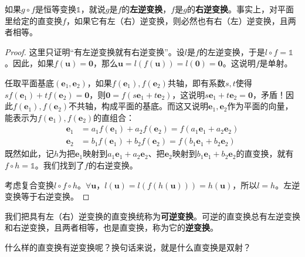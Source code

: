 \documentclass[12pt,UTF8,fontset=none]{ctexbook}
\begin{document}
如果$g\circ f$是恒等变换$\mathds{1}$，就说$g$是$f$的\textbf{左逆变换}，$f$是$g$的\textbf{右逆变换}。事实上，对平面里给定的直变换$f$，如果它有左（右）逆变换，则必然也有右（左）逆变换，且两者相等。

\begin{proof}
    这里只证明“有左逆变换就有右逆变换”。设$l$是$f$的左逆变换，于是$l\circ f = \mathds{1}$。因此，如果$f(\mathbf{u}) = \mathbf{0}$，那么$\mathbf{u} = l(f(\mathbf{u})) = l(\mathbf{0}) = \mathbf{0}$。这说明$f$是单射。
    
    任取平面基底$(\mathbf{e}_1,\mathbf{e}_2)$，如果$f(\mathbf{e}_1),f(\mathbf{e}_2)$共轴，即有系数$s,t$使得$sf(\mathbf{e}_1)+tf(\mathbf{e}_2)=\mathbf{0}$，则$\mathbf{0} = f(s\mathbf{e}_1+t\mathbf{e}_2)$，这说明$s\mathbf{e}_1+t\mathbf{e}_2 = \mathbf{0}$，矛盾！因此$f(\mathbf{e}_1),f(\mathbf{e}_2)$不共轴，构成平面的基底。而这又说明$\mathbf{e}_1,\mathbf{e}_2$作为平面的向量，能表示为$f(\mathbf{e}_1),f(\mathbf{e}_2)$的直组合：
    \begin{align*}
        \mathbf{e}_1 & = a_1f(\mathbf{e}_1) + a_2f(\mathbf{e}_2) = f(a_1\mathbf{e}_1+a_2\mathbf{e}_2)\\ 
        \mathbf{e}_2 & = b_1f(\mathbf{e}_1) + b_2f(\mathbf{e}_2) = f(b_1\mathbf{e}_1+b_2\mathbf{e}_2)
    \end{align*}
    既然如此，记$h$为把$\mathbf{e}_1$映射到$a_1\mathbf{e}_1+a_2\mathbf{e}_2$、把$\mathbf{e}_2$映射到$b_1\mathbf{e}_1+b_2\mathbf{e}_2$的直变换，就有$f\circ h = \mathds{1}$。我们找到了$f$的右逆变换。

    考虑复合变换$l\circ f\circ h$。$\forall \mathbf{u}$，$l(\mathbf{u}) = l(f(h(\mathbf{u}))) = h(\mathbf{u})$，所以$l = h$。左逆变换等于右逆变换。
\end{proof}

我们把具有左（右）逆变换的直变换统称为\textbf{可逆变换}。可逆的直变换总有左逆变换和右逆变换，且两者相等，也是直变换，称为它的\textbf{逆变换}。

什么样的直变换有逆变换呢？换句话来说，就是什么直变换是双射？
\end{document}
